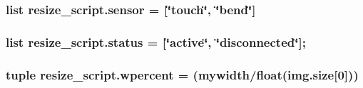 \subsubsection[{\texorpdfstring{sensor}{sensor}}]{\setlength{\rightskip}{0pt plus 5cm}list resize\+\_\+script.\+sensor = \mbox{[}\char`\"{}touch\char`\"{}, \char`\"{}bend\char`\"{}\mbox{]}}\hypertarget{namespaceresize__script_a66105bd89de1722c111fceca24ab88c1}{}\label{namespaceresize__script_a66105bd89de1722c111fceca24ab88c1}
\subsubsection[{\texorpdfstring{status}{status}}]{\setlength{\rightskip}{0pt plus 5cm}list resize\+\_\+script.\+status = \mbox{[}\char`\"{}active\char`\"{}, \char`\"{}disconnected\char`\"{}\mbox{]};}\hypertarget{namespaceresize__script_a0988989e1e7bc7ece1be39f8d52beaa9}{}\label{namespaceresize__script_a0988989e1e7bc7ece1be39f8d52beaa9}
\subsubsection[{\texorpdfstring{wpercent}{wpercent}}]{\setlength{\rightskip}{0pt plus 5cm}tuple resize\+\_\+script.\+wpercent = ({\bf mywidth}/float(img.\+size\mbox{[}0\mbox{]}))}\hypertarget{namespaceresize__script_a19164b83e4fc883571c218bdc59c3796}{}\label{namespaceresize__script_a19164b83e4fc883571c218bdc59c3796}
